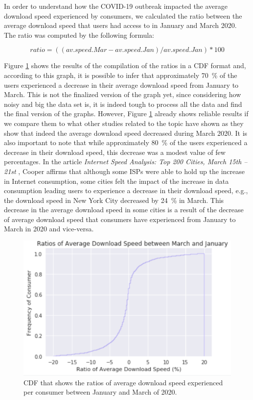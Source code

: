 \documentclass[conference,10pt]{IEEEtran}
\begin{document}
In order to understand how the COVID-19 outbreak impacted the average download speed experienced by consumers, we calculated the ratio between the average download speed that users had access to in January and March 2020. The ratio was computed by the following formula:

\begin{equation}
ratio= ((av.speed.Mar - av.speed.Jan)/ av.speed.Jan)*100
\end{equation}

Figure \ref{fig:downloadspeed2020} shows the results of the compilation of the ratios in a CDF format and, according to this graph, it is possible to infer that approximately \SI{70}{\percent} of the users experienced a decrease in their average download speed from January to March. This is not the finalized version of the graph yet, since considering how noisy and big the data set is, it is indeed tough to process all the data and find the final version of the graphs. However, Figure \ref{fig:downloadspeed2020} already shows reliable results if we compare them to what other studies related to the topic have shown as they show that indeed the average download speed decreased during March 2020. It is also important to note that while approximately \SI{80}{\percent} of the users experienced a decrease in their download speed, this decrease was a modest value of few percentages. In the article \textit{ Internet Speed Analysis: Top 200 Cities, March 15th – 21st} \cite{cooper}, Cooper affirms that although some ISPs were able to hold up the increase in  Internet consumption, some cities felt the impact of the increase in data consumption leading users to experience a decrease in their download speed, e.g., the download speed in New York City decreased by \SI{24}{\percent} in March. This decrease in the average download speed in some cities is a result of the decrease of average download speed that consumers have experienced from January to March in 2020 and vice-versa.

\begin{figure}
\centering
\includegraphics[width=1.0\linewidth]{figs/downspeed.PNG}
\caption{CDF that shows the ratios of average download speed experienced per consumer between January and March of 2020.}
\label{fig:downloadspeed2020}
\end{figure}
\end{document}
